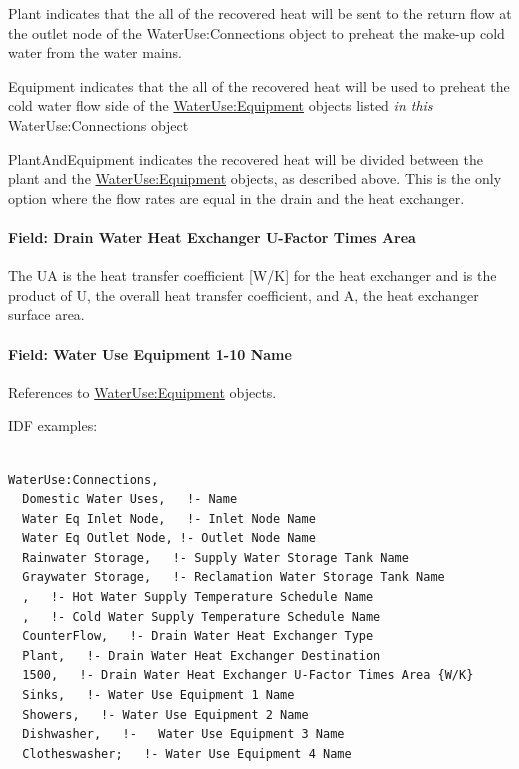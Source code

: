 Plant indicates that the all of the recovered heat will be sent to the return flow at the outlet node of the WaterUse:Connections object to preheat the make-up cold water from the water mains.

Equipment indicates that the all of the recovered heat will be used to preheat the cold water flow side of the \hyperref[wateruseequipment]{WaterUse:Equipment} objects listed \emph{in this} WaterUse:Connections object

PlantAndEquipment indicates the recovered heat will be divided between the plant and the \hyperref[wateruseequipment]{WaterUse:Equipment} objects, as described above. This is the only option where the flow rates are equal in the drain and the heat exchanger.

\paragraph{Field: Drain Water Heat Exchanger U-Factor Times Area}\label{field-drain-water-heat-exchanger-u-factor-times-area}

The UA is the heat transfer coefficient {[}W/K{]} for the heat exchanger and is the product of U, the overall heat transfer coefficient, and A, the heat exchanger surface area.

\paragraph{Field: Water Use Equipment 1-10 Name}\label{field-water-use-equipment-1-10-name}

References to \hyperref[wateruseequipment]{WaterUse:Equipment} objects.

IDF examples:

\begin{lstlisting}

WaterUse:Connections,
  Domestic Water Uses,   !- Name
  Water Eq Inlet Node,   !- Inlet Node Name
  Water Eq Outlet Node, !- Outlet Node Name
  Rainwater Storage,   !- Supply Water Storage Tank Name
  Graywater Storage,   !- Reclamation Water Storage Tank Name
  ,   !- Hot Water Supply Temperature Schedule Name
  ,   !- Cold Water Supply Temperature Schedule Name
  CounterFlow,   !- Drain Water Heat Exchanger Type
  Plant,   !- Drain Water Heat Exchanger Destination
  1500,   !- Drain Water Heat Exchanger U-Factor Times Area {W/K}
  Sinks,   !- Water Use Equipment 1 Name
  Showers,   !- Water Use Equipment 2 Name
  Dishwasher,   !-   Water Use Equipment 3 Name
  Clotheswasher;   !- Water Use Equipment 4 Name
\end{lstlisting}

